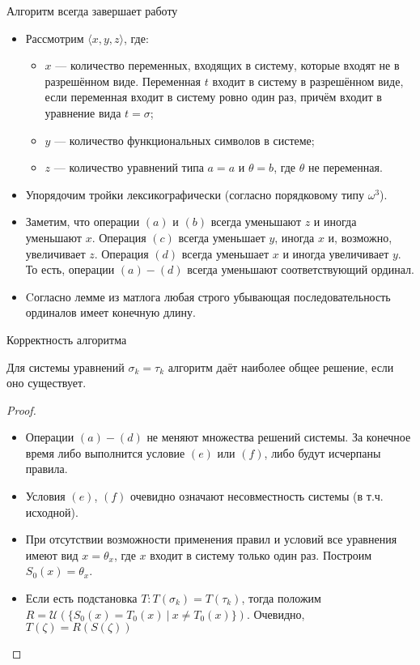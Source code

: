 \documentclass[aspectratio=169]{beamer}
\begin{document}
\begin{frame}{Алгоритм всегда завершает работу}
\begin{itemize}
\item Рассмотрим $\langle x,y,z \rangle$,
где:
\begin{itemize}\item $x$ --- количество переменных, входящих в систему, которые входят не в разрешённом виде.
Переменная $t$ входит в систему в разрешённом виде, если переменная входит в систему ровно один раз, причём входит в уравнение вида $t = \sigma$;
\item $y$ --- количество функциональных символов в системе;
\item $z$ --- количество уравнений типа $a=a$ и $\theta=b$, где $\theta$ не переменная.
\end{itemize}
\item Упорядочим тройки лексикографически (согласно порядковому типу $\omega^3$).

\item Заметим, что операции $(a)$ и $(b)$ всегда уменьшают $z$ и иногда уменьшают $x$.
Операция $(c)$ всегда уменьшает $y$, иногда $x$ и, возможно, увеличивает $z$.
Операция $(d)$ всегда уменьшает $x$ и иногда увеличивает $y$. То есть, операции $(a)-(d)$ всегда уменьшают
соответствующий ординал.

\item Cогласно лемме из матлога любая строго убывающая последовательность ординалов имеет конечную длину.
\end{itemize}
\end{frame}

\begin{frame}{Корректность алгоритма}
\begin{thm}Для системы уравнений $\sigma_k = \tau_k$ алгоритм даёт наиболее общее решение, если оно существует.\end{thm}
\begin{proof}
\begin{itemize}
\item Операции $(a)-(d)$ не меняют множества решений системы. За конечное время либо выполнится условие $(e)$ или $(f)$,
либо будут исчерпаны правила.
\item Условия $(e)$, $(f)$ очевидно означают несовместность системы (в т.ч. исходной).
\item При отсутствии возможности применения правил и условий все уравнения имеют вид $x = \theta_x$,
где $x$ входит в систему только один раз. Построим $S_0(x) = \theta_x$. 

\item Если есть подстановка $T: T(\sigma_k) = T(\tau_k)$, тогда положим $R = \mathcal{U}(\{ S_0(x) = T_0(x)\ |\ x \ne T_0(x)\})$.
Очевидно, $T(\zeta) = R(S(\zeta))$
\end{itemize}
\end{proof}
\end{frame}
\end{document}
